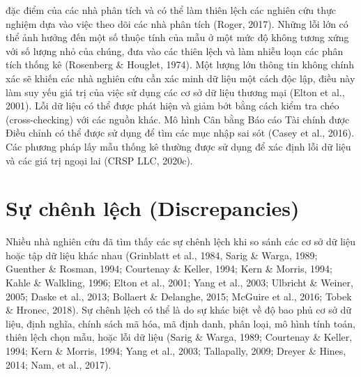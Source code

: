 đặc điểm của các nhà phân tích và có thể làm thiên lệch các nghiên cứu thực nghiệm dựa vào việc theo dõi các nhà phân tích (Roger, 2017). Những lỗi lớn có thể ảnh hưởng đến một số thuộc tính của mẫu ở một mức độ không tương xứng với số lượng nhỏ của chúng, đưa vào các thiên lệch và làm nhiễu loạn các phân tích thống kê (Rosenberg \& Houglet, 1974). Một lượng lớn thông tin không chính xác sẽ khiến các nhà nghiên cứu cần xác minh dữ liệu một cách độc lập, điều này làm suy yếu giá trị của việc sử dụng các cơ sở dữ liệu thương mại (Elton et al., 2001). Lỗi dữ liệu có thể được phát hiện và giảm bớt bằng cách kiểm tra chéo (cross-checking) với các nguồn khác. Mô hình Cân bằng Báo cáo Tài chính được Điều chỉnh có thể được sử dụng để tìm các mục nhập sai sót (Casey et al., 2016). Các phương pháp lấy mẫu thống kê thường được sử dụng để xác định lỗi dữ liệu và các giá trị ngoại lai (CRSP LLC, 2020c).

\section{Sự chênh lệch (Discrepancies)}

Nhiều nhà nghiên cứu đã tìm thấy các sự chênh lệch khi so sánh các cơ sở dữ liệu hoặc tập dữ liệu khác nhau (Grinblatt et al., 1984, Sarig \& Warga, 1989; Guenther \& Rosman, 1994; Courtenay \& Keller, 1994; Kern \& Morris, 1994; Kahle \& Walkling, 1996; Elton et al., 2001; Yang et al., 2003; Ulbricht \& Weiner, 2005; Daske et al., 2013; Bollaert \& Delanghe, 2015; McGuire et al., 2016; Tobek \& Hronec, 2018). Sự chênh lệch có thể là do sự khác biệt về độ bao phủ cơ sở dữ liệu, định nghĩa, chính sách mã hóa, mã định danh, phân loại, mô hình tính toán, thiên lệch chọn mẫu, hoặc lỗi dữ liệu (Sarig \& Warga, 1989; Courtenay \& Keller, 1994; Kern \& Morris, 1994; Yang et al., 2003; Tallapally, 2009; Dreyer \& Hines, 2014; Nam, et al., 2017).

